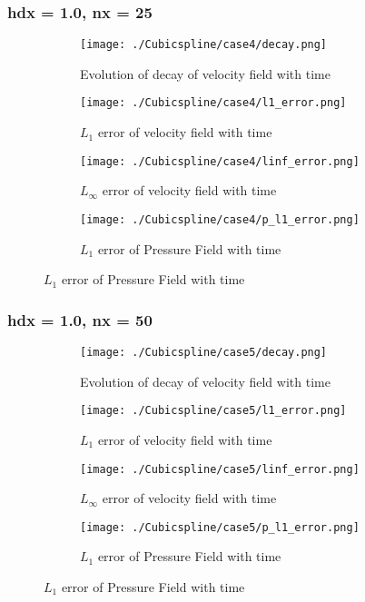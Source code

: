 \documentclass[11pt, a4paper]{article}
\begin{document}
\subsubsection{hdx = 1.0, nx = 25}
\begin{figure}[H]
\begin{subfigure}{0.48\textwidth}
\texttt{[image: ./Cubicspline/case4/decay.png]}
\caption{Evolution of decay of velocity field with time}
\end{subfigure}
\begin{subfigure}{0.48\textwidth}
\texttt{[image: ./Cubicspline/case4/l1\_error.png]}
\caption{$L_1$ error of velocity field with time}
\end{subfigure}
\medskip
\begin{subfigure}{0.48\textwidth}
\texttt{[image: ./Cubicspline/case4/linf\_error.png]}
\caption{$L_\infty$ error of velocity field with time}
\end{subfigure}
\begin{subfigure}{0.48\textwidth}
\texttt{[image: ./Cubicspline/case4/p\_l1\_error.png]}
\caption{$L_1$ error of Pressure Field with time}
\end{subfigure}
\end{figure}

\subsubsection{hdx = 1.0, nx = 50}
\begin{figure}[H]
\begin{subfigure}{0.48\textwidth}
\texttt{[image: ./Cubicspline/case5/decay.png]}
\caption{Evolution of decay of velocity field with time}
\end{subfigure}
\begin{subfigure}{0.48\textwidth}
\texttt{[image: ./Cubicspline/case5/l1\_error.png]}
\caption{$L_1$ error of velocity field with time}
\end{subfigure}
\medskip
\begin{subfigure}{0.48\textwidth}
\texttt{[image: ./Cubicspline/case5/linf\_error.png]}
\caption{$L_\infty$ error of velocity field with time}
\end{subfigure}
\begin{subfigure}{0.48\textwidth}
\texttt{[image: ./Cubicspline/case5/p\_l1\_error.png]}
\caption{$L_1$ error of Pressure Field with time}
\end{subfigure}
\end{figure}
\end{document}
